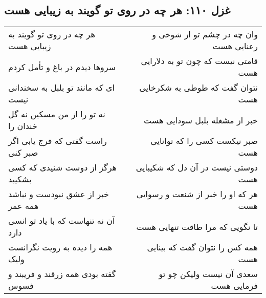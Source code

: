\begin{center}
\section*{غزل ۱۱۰: هر چه در روی تو گویند به زیبایی هست}
\label{sec:110}
\begin{longtable}{l p{0.5cm} r}
هر چه در روی تو گویند به زیبایی هست
&&
وان چه در چشم تو از شوخی و رعنایی هست
\\
سروها دیدم در باغ و تأمل کردم
&&
قامتی نیست که چون تو به دلارایی هست
\\
ای که مانند تو بلبل به سخندانی نیست
&&
نتوان گفت که طوطی به شکرخایی هست
\\
نه تو را از من مسکین نه گل خندان را
&&
خبر از مشغله بلبل سودایی هست
\\
راست گفتی که فرج یابی اگر صبر کنی
&&
صبر نیکست کسی را که توانایی هست
\\
هرگز از دوست شنیدی که کسی بشکیبد
&&
دوستی نیست در آن دل که شکیبایی هست
\\
خبر از عشق نبودست و نباشد همه عمر
&&
هر که او را خبر از شنعت و رسوایی هست
\\
آن نه تنهاست که با یاد تو انسی دارد
&&
تا نگویی که مرا طاقت تنهایی هست
\\
همه را دیده به رویت نگرانست ولیک
&&
همه کس را نتوان گفت که بینایی هست
\\
گفته بودی همه زرقند و فریبند و فسوس
&&
سعدی آن نیست ولیکن چو تو فرمایی هست
\\
\end{longtable}
\end{center}
